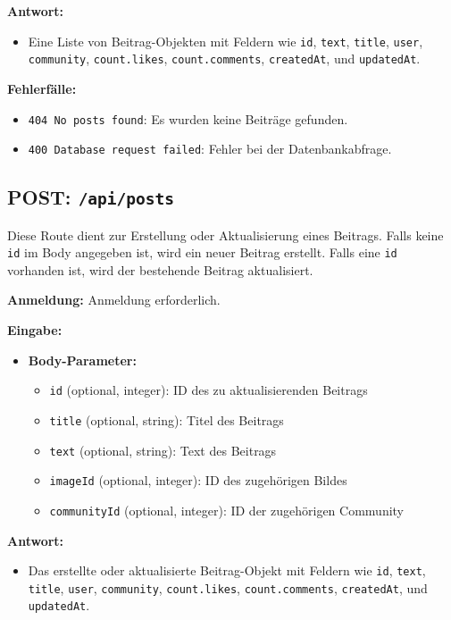 \documentclass[a4paper,12pt]{article}
\begin{document}
\textbf{Antwort:}
\begin{itemize}
    \item Eine Liste von Beitrag-Objekten mit Feldern wie
        \texttt{id},
        \texttt{text},
        \texttt{title},
        \texttt{user},
        \texttt{community},
        \texttt{count.likes},
        \texttt{count.comments},
        \texttt{createdAt},
        und \texttt{updatedAt}.
\end{itemize}

\textbf{Fehlerfälle:}
\begin{itemize}
    \item \texttt{404 No posts found}:
        Es wurden keine Beiträge gefunden.
    \item \texttt{400 Database request failed}:
        Fehler bei der Datenbankabfrage.
\end{itemize}

\subsection{POST: \texttt{/api/posts}}

Diese Route dient zur Erstellung oder Aktualisierung eines Beitrags. Falls
keine \texttt{id} im Body angegeben ist, wird ein neuer Beitrag erstellt. Falls
eine \texttt{id} vorhanden ist, wird der bestehende Beitrag aktualisiert.

\textbf{Anmeldung:} Anmeldung erforderlich.

\textbf{Eingabe:}
\begin{itemize}
    \item \textbf{Body-Parameter:}
    \begin{itemize}
        \item \texttt{id} (optional, integer):
            ID des zu aktualisierenden Beitrags
        \item \texttt{title} (optional, string):
            Titel des Beitrags
        \item \texttt{text} (optional, string):
            Text des Beitrags
        \item \texttt{imageId} (optional, integer):
            ID des zugehörigen Bildes
        \item \texttt{communityId} (optional, integer):
            ID der zugehörigen Community
    \end{itemize}
\end{itemize}

\textbf{Antwort:}
\begin{itemize}
    \item Das erstellte oder aktualisierte Beitrag-Objekt mit Feldern wie
        \texttt{id},
        \texttt{text},
        \texttt{title},
        \texttt{user},
        \texttt{community},
        \texttt{count.likes},
        \texttt{count.comments},
        \texttt{createdAt},
        und \texttt{updatedAt}.
\end{itemize}
\end{document}
